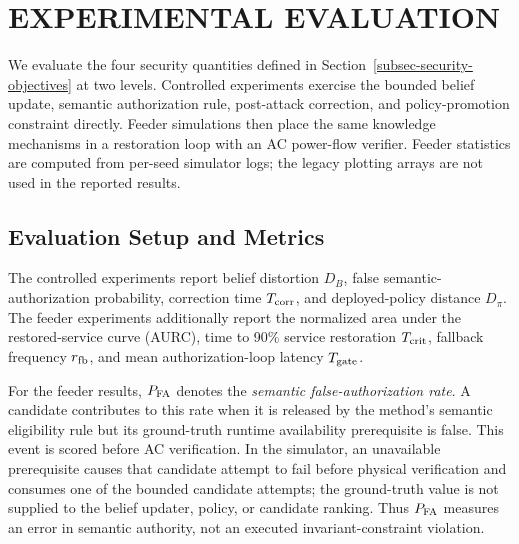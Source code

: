 \section{EXPERIMENTAL EVALUATION}
\label{sec:experiments}

We evaluate the four security quantities defined in Section~\ref{subsec-security-objectives} at two levels. Controlled experiments exercise the bounded belief update, semantic authorization rule, post-attack correction, and policy-promotion constraint directly. Feeder simulations then place the same knowledge mechanisms in a restoration loop with an AC power-flow verifier. Feeder statistics are computed from per-seed simulator logs; the legacy plotting arrays are not used in the reported results.

\subsection{Evaluation Setup and Metrics}
\label{subsec-exp-questions}

The controlled experiments report belief distortion $D_B$, false semantic-authorization probability, correction time $T_{\rm corr}$, and deployed-policy distance $D_\pi$. The feeder experiments additionally report the normalized area under the restored-service curve (AURC), time to 90\% service restoration $T_{\rm crit}$, fallback frequency $r_{\rm fb}$, and mean authorization-loop latency $T_{\rm gate}$.

For the feeder results, $P_{\rm FA}$ denotes the \emph{semantic false-authorization rate}. A candidate contributes to this rate when it is released by the method's semantic eligibility rule but its ground-truth runtime availability prerequisite is false. This event is scored before AC verification. In the simulator, an unavailable prerequisite causes that candidate attempt to fail before physical verification and consumes one of the bounded candidate attempts; the ground-truth value is not supplied to the belief updater, policy, or candidate ranking. Thus $P_{\rm FA}$ measures an error in semantic authority, not an executed invariant-constraint violation.

\begin{table}[t]
\centering
\caption{Controlled security-experiment configuration.}
\label{tab-exp-controlled-config}
\setlength{\tabcolsep}{1.3mm}
\end{table}

